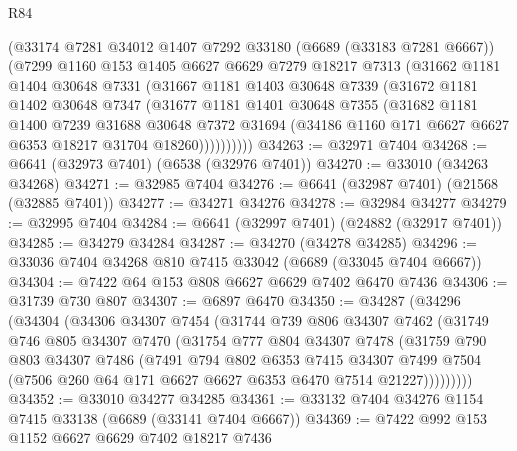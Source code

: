 \begin{lexlean}{R84}
\begin{coremodule}
        (@33174
          @7281
          @34012
          @1407
          @7292
          @33180
          (@6689 (@33183 @7281 @6667))
          (@7299
            @1160
            @153
            @1405
            @6627
            @6629
            @7279
            @18217
            @7313
            (@31662
              @1181
              @1404
              @30648
              @7331
              (@31667
                @1181
                @1403
                @30648
                @7339
                (@31672
                  @1181
                  @1402
                  @30648
                  @7347
                  (@31677
                    @1181
                    @1401
                    @30648
                    @7355
                    (@31682
                      @1181
                      @1400
                      @7239
                      @31688
                      @30648
                      @7372
                      @31694
                      (@34186 @1160 @171 @6627 @6627 @6353 @18217 @31704 @18260))))))))))
@34263 := @32971 @7404
@34268 := @6641 (@32973 @7401) (@6538 (@32976 @7401))
@34270 := @33010 (@34263 @34268)
@34271 := @32985 @7404
@34276 := @6641 (@32987 @7401) (@21568 (@32885 @7401))
@34277 := @34271 @34276
@34278 := @32984 @34277
@34279 := @32995 @7404
@34284 := @6641 (@32997 @7401) (@24882 (@32917 @7401))
@34285 := @34279 @34284
@34287 := @34270 (@34278 @34285)
@34296 := @33036 @7404 @34268 @810 @7415 @33042 (@6689 (@33045 @7404 @6667))
@34304 := @7422 @64 @153 @808 @6627 @6629 @7402 @6470 @7436
@34306 := @31739 @730 @807
@34307 := @6897 @6470
@34350 := @34287
    (@34296
      (@34304
        (@34306
          @34307
          @7454
          (@31744
            @739
            @806
            @34307
            @7462
            (@31749
              @746
              @805
              @34307
              @7470
              (@31754
                @777
                @804
                @34307
                @7478
                (@31759
                  @790
                  @803
                  @34307
                  @7486
                  (@7491
                    @794
                    @802
                    @6353
                    @7415
                    @34307
                    @7499
                    @7504
                    (@7506 @260 @64 @171 @6627 @6627 @6353 @6470 @7514 @21227)))))))))
@34352 := @33010 @34277 @34285
@34361 := @33132 @7404 @34276 @1154 @7415 @33138 (@6689 (@33141 @7404 @6667))
@34369 := @7422 @992 @153 @1152 @6627 @6629 @7402 @18217 @7436

\end{coremodule}
\end{lexlean}
